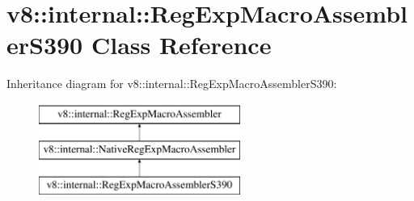 \hypertarget{classv8_1_1internal_1_1RegExpMacroAssemblerS390}{}\section{v8\+:\+:internal\+:\+:Reg\+Exp\+Macro\+Assembler\+S390 Class Reference}
\label{classv8_1_1internal_1_1RegExpMacroAssemblerS390}
Inheritance diagram for v8\+:\+:internal\+:\+:Reg\+Exp\+Macro\+Assembler\+S390\+:\begin{figure}[H]
\begin{center}
\leavevmode
\includegraphics[height=3.000000cm]{classv8_1_1internal_1_1RegExpMacroAssemblerS390}
\end{center}
\end{figure}
